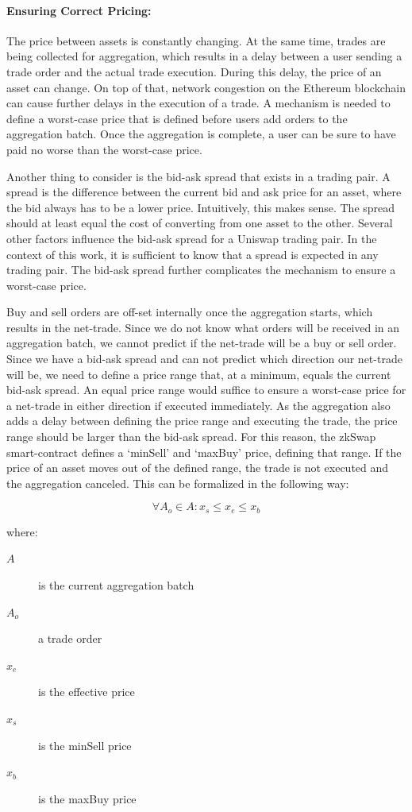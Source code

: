 \documentclass[../../thesis.tex]{subfiles}
\begin{document}
\paragraph{Ensuring Correct Pricing:}
The price between assets is constantly changing. At the same time, trades are being collected for aggregation, which results in a delay between a user sending a trade order and the actual trade execution. During this delay, the price of an asset can change. On top of that, network congestion on the Ethereum blockchain can cause further delays in the execution of a trade. A mechanism is needed to define a worst-case price that is defined before users add orders to the aggregation batch. Once the aggregation is complete, a user can be sure to have paid no worse than the worst-case price.

Another thing to consider is the bid-ask spread that exists in a trading pair. A spread is the difference between the current bid and ask price for an asset, where the bid always has to be a lower price. Intuitively, this makes sense. The spread should at least equal the cost of converting from one asset to the other. Several other factors influence the bid-ask spread for a Uniswap trading pair. In the context of this work, it is sufficient to know that a spread is expected in any trading pair. The bid-ask spread further complicates the mechanism to ensure a worst-case price. 

Buy and sell orders are off-set internally once the aggregation starts, which results in the net-trade. Since we do not know what orders will be received in an aggregation batch, we cannot predict if the net-trade will be a buy or sell order. Since we have a bid-ask spread and can not predict which direction our net-trade will be, we need to define a price range that, at a minimum, equals the current bid-ask spread. An equal price range would suffice to ensure a worst-case price for a net-trade in either direction if executed immediately.
As the aggregation also adds a delay between defining the price range and executing the trade, the price range should be larger than the bid-ask spread. For this reason, the zkSwap smart-contract defines a `minSell' and `maxBuy' price, defining that range. If the price of an asset moves out of the defined range, the trade is not executed and the aggregation canceled. This can be formalized in the following way: 

$$\forall A_o\in A: x_s \leq x_e \leq x_b$$


where:
\begin{description}
\item[$A$] is the current aggregation batch
\item[$A_o$] a trade order
\item[$x_e$] is the effective price 
\item[$x_s$] is the minSell price
\item[$x_b$] is the maxBuy price 
\end{description}
\end{document}
